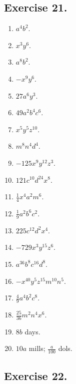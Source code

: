 \documentclass{book}
\begin{document}
\subsection*{Exercise 21.}

\begin{enumerate}

\item  $a^4b^2$.
\item  $x^3y^6$.
\item  $a^8b^2$.
\item  $-x^9y^6$.
\item  $27 a^6y^3$.
\item  $49 a^2b^4c^6$.
\item  $x^5y^5z^{10}$.
\item  $m^8n^4d^4$.
\item $-125 x^9y^{12}z^3$.
\item  $121 c^{10}d^{24}x^8$.
\item  $\frac{1}{4} x^4a^2m^6$.
\item  $\frac{1}{9} a^2b^6c^2$.
\item  $225 c^{12}d^2x^4$.
\item $-729 x^3y^{15}z^6$.
\item  $a^{36}b^8c^{16}d^8$.
\item $-x^{40}y^5z^{15}m^{10}n^5$.
\item  $\frac{4}{9} a^4b^2c^8$.
\item  $\frac{25}{36} m^2n^4x^6$.
\item  $8 b$ days.
\item  $10 a$ mills; $\frac{a}{100}$ dols.

\end{enumerate}

\subsection*{Exercise 22.}
\end{document}

